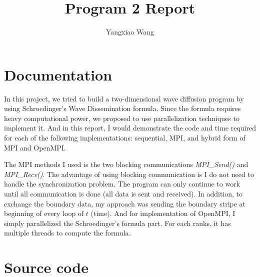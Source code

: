 \documentclass[11pt, letterpaper]{article}
\title{\textbf{Program 2 Report}}
\author{Yangxiao Wang}
\date{ }
\begin{document}
	
	\maketitle
	
	\tableofcontents
	\pagebreak
	
	\section{Documentation}
	In this project, we tried to build a two-dimensional wave diffusion program by using Schroedinger's Wave Dissemination formula. Since the formula requires heavy computational power, we proposed to use parallelization techniques to implement it. And in this report, I would demonstrate the code and time required for each of the following implementations: sequential, MPI, and hybrid form of MPI and OpenMPI.	\par
	The MPI methods I used is the two blocking communications \textit{MPI\_Send()} and \textit{MPI\_Recv()}. The advantage of using blocking communication is I do not need to handle the synchronization problem. The program can only continue to work until all communication is done (all data is sent and received). In addition, to exchange the boundary data, my approach was sending the boundary stripe at beginning of every loop of $t$ (time). And for implementation of OpenMPI, I simply parallelized the Schroedinger's formula part. For each ranks, it has multiple threads to compute the formula.
	
	
	\section {Source code}
\end{document}
